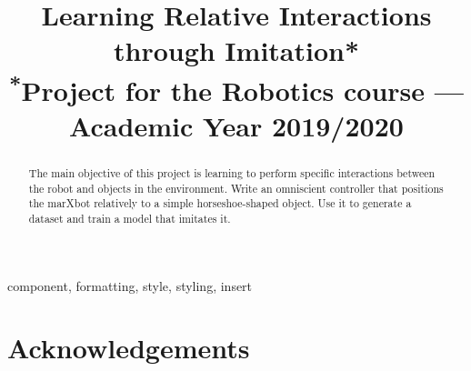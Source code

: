 \documentclass[conference]{IEEEtran}
\begin{document}
\title{Learning Relative Interactions through Imitation*\\
{\footnotesize \textsuperscript{*}Project for the Robotics course --- Academic Year 2019/2020
}
}

\author{
\and
{}
}

\maketitle

\begin{abstract}
The main objective of this project is learning to perform specific interactions between the robot and objects in the 
environment.
Write an omniscient controller that positions the marXbot relatively to a simple horseshoe-shaped object. Use it to 
generate a dataset and train a model that imitates it.
\end{abstract}

\begin{IEEEkeywords}
component, formatting, style, styling, insert
\end{IEEEkeywords}








\section*{Acknowledgements}




\end{document}
